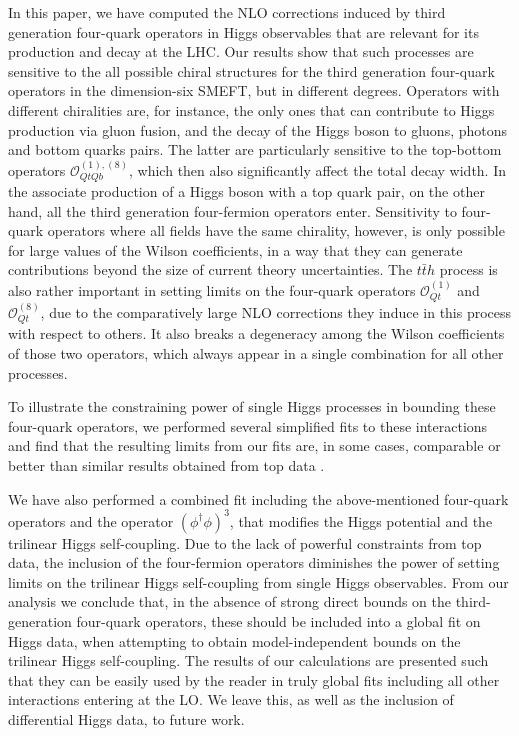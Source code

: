 In this paper, we have computed the NLO corrections induced by third generation four-quark operators in Higgs observables that are relevant for its production and decay at the LHC. 
Our results show that such processes are sensitive to the all possible chiral structures for the third generation four-quark operators in the dimension-six SMEFT, but in different degrees. 
Operators with different chiralities are, for instance, the only ones that can contribute to Higgs production via gluon fusion, and the decay of the Higgs boson to gluons, photons and bottom quarks pairs.  The latter are particularly sensitive to the top-bottom operators $\mathcal{O}_{QtQb}^{(1),(8)}$, which then also significantly affect the total decay width. In the associate production of a Higgs boson with a top quark pair, on the other hand, all the third generation four-fermion operators enter.
Sensitivity to four-quark operators where all fields have the same chirality, however, is only possible for large values of the Wilson coefficients, in a way that they can generate contributions beyond the size of current theory uncertainties. 
%
The $t\bar{t}h$ process is also rather important in setting limits on the four-quark operators $\mathcal{O}_{Qt}^{(1)}$ and $\mathcal{O}_{Qt}^{(8)}$, due to the comparatively large NLO corrections they induce in this process with respect to others. It also breaks a degeneracy among the Wilson coefficients of those two operators, which always appear in a single combination for all other processes. 
\par
To illustrate the constraining power of single Higgs processes in bounding these four-quark operators, we performed several simplified fits to these interactions and find that the resulting limits from our fits are, in some cases, comparable or better than similar results obtained from top data \cite{Ethier:2021bye, Hartland:2019bjb}.
\par
We have also performed a combined fit including the above-mentioned four-quark operators and the operator $\left(\phi^\dagger \phi\right)^3$, that modifies the Higgs potential and the trilinear Higgs self-coupling. Due to the lack of powerful constraints from top data, the inclusion of the four-fermion operators diminishes the power of setting limits on the trilinear Higgs self-coupling
from single Higgs observables. 
From our analysis we conclude that, in the absence of strong direct bounds on the third-generation four-quark operators, these should be included into a global fit on Higgs data, when attempting to obtain model-independent bounds on the trilinear Higgs self-coupling. The results of our calculations are presented such that they can be easily used by the reader in truly global fits including all other interactions entering at the LO. 
We leave this, as well as the inclusion of differential Higgs data, to future work.
%

